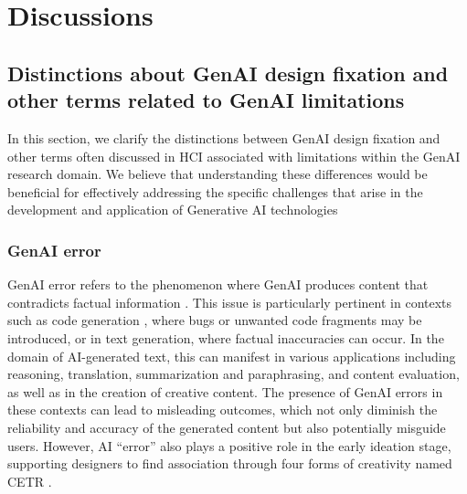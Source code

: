 \section{Discussions}

\subsection{Distinctions about GenAI design fixation and other terms related to GenAI limitations}
In this section, we clarify the distinctions between GenAI design fixation and other terms often discussed in HCI associated with limitations within the GenAI research domain. We believe that understanding these differences would be beneficial for effectively addressing the specific challenges that arise in the development and application of Generative AI technologies


\subsubsection{GenAI error}
GenAI error refers to the phenomenon where GenAI produces content that contradicts factual information \cite{liu2024smart}. This issue is particularly pertinent in contexts such as code generation \cite{ebert2023generative}, where bugs or unwanted code fragments may be introduced, or in text generation, where factual inaccuracies can occur. In the domain of AI-generated text, this can manifest in various applications including reasoning, translation, summarization and paraphrasing, and content evaluation, as well as in the creation of creative content. The presence of GenAI errors in these contexts can lead to misleading outcomes, which not only diminish the reliability and accuracy of the generated content but also potentially misguide users. However, AI “error” also plays a positive role in the early ideation stage, supporting designers to find association through four forms of creativity named CETR \cite{liu2024smart}.


